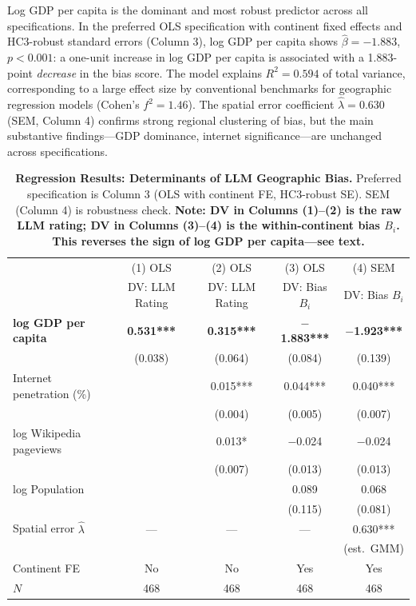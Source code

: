 \documentclass[12pt]{article}
\begin{document}
Log GDP per capita is the dominant and most robust predictor across all specifications. In the preferred OLS specification with continent fixed effects and HC3-robust standard errors (Column 3), log GDP per capita shows $\hat{\beta} = -1.883$, $p < 0.001$: a one-unit increase in log GDP per capita is associated with a 1.883-point \emph{decrease} in the bias score. The model explains $R^2 = 0.594$ of total variance, corresponding to a large effect size by conventional benchmarks for geographic regression models (Cohen's $f^2 = 1.46$). The spatial error coefficient $\hat{\lambda} = 0.630$ (SEM, Column 4) confirms strong regional clustering of bias, but the main substantive findings---GDP dominance, internet significance---are unchanged across specifications.

\begin{table}[htbp]
\caption{\textbf{Regression Results: Determinants of LLM Geographic Bias.} Preferred specification is Column 3 (OLS with continent FE, HC3-robust SE). SEM (Column 4) is robustness check. \textbf{Note: DV in Columns (1)--(2) is the raw LLM rating; DV in Columns (3)--(4) is the within-continent bias $B_i$. This reverses the sign of log GDP per capita---see text.}}
\label{tab:regression}
\begin{tabular}{lcccc}
\toprule
 & (1) OLS & (2) OLS & (3) OLS & (4) SEM \\
 & DV: LLM Rating & DV: LLM Rating & DV: Bias $B_i$ & DV: Bias $B_i$ \\
\midrule
\textbf{log GDP per capita} & \textbf{0.531***} & \textbf{0.315***} & \textbf{$-$1.883***} & \textbf{$-$1.923***} \\
 & (0.038) & (0.064) & (0.084) & (0.139) \\
Internet penetration (\%) & & 0.015*** & 0.044*** & 0.040*** \\
 & & (0.004) & (0.005) & (0.007) \\
log Wikipedia pageviews & & 0.013* & $-$0.024 & $-$0.024 \\
 & & (0.007) & (0.013) & (0.013) \\
log Population & & & 0.089 & 0.068 \\
 & & & (0.115) & (0.081) \\
Spatial error $\hat{\lambda}$ & --- & --- & --- & 0.630*** \\
 & & & & (est.\ GMM) \\
\midrule
Continent FE & No & No & Yes & Yes \\
$N$ & 468 & 468 & 468 & 468 \\

\end{tabular}
\end{table}
\end{document}
